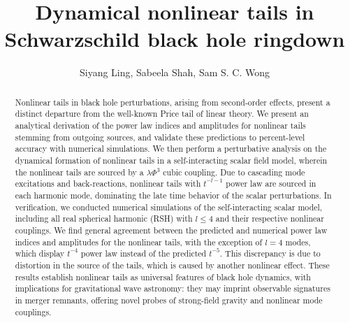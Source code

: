 \documentclass[reprint,aps,physrev,superscriptaddress,10pt,notitlepage,prd,nofootinbib,onecolumn]{revtex4-2}
\begin{document}

\title{Dynamical nonlinear tails in Schwarzschild black hole ringdown}


\author{Siyang Ling, Sabeela Shah, Sam S. C. Wong}




\begin{abstract}
  Nonlinear tails in black hole perturbations, arising from second-order effects, present a distinct departure from the well-known Price tail of linear theory.
  We present an analytical derivation of the power law indices and amplitudes for nonlinear tails stemming from outgoing sources, and validate these predictions to percent-level accuracy with numerical simulations.
  We then perform a perturbative analysis on the dynamical formation of nonlinear tails in a self-interacting scalar field model, wherein the nonlinear tails are sourced by a $\lambda \Phi^3$ cubic coupling.
  Due to cascading mode excitations and back-reactions, nonlinear tails with $t^{-l-1}$ power law are sourced in each harmonic mode, dominating the late time behavior of the scalar perturbations.
  In verification, we conducted numerical simulations of the self-interacting scalar model, including all real spherical harmonic (RSH) with $l\leq 4$ and their respective nonlinear couplings.
  We find general agreement between the predicted and numerical power law indices and amplitudes for the nonlinear tails, with the exception of $l=4$ modes, which display $t^{-4}$ power law instead of the predicted $t^{-5}$.
  This discrepancy is due to distortion in the source of the tails, which is caused by another nonlinear effect.
  These results establish nonlinear tails as universal features of black hole dynamics, with implications for gravitational wave astronomy: they may imprint observable signatures in merger remnants, offering novel probes of strong-field gravity and nonlinear mode couplings.
\end{abstract}



\maketitle
\end{document}
